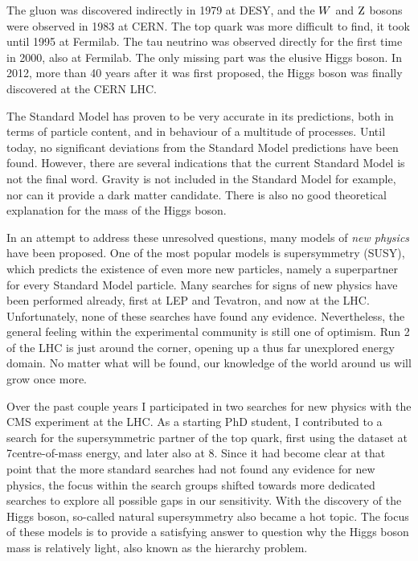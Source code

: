 The gluon was discovered indirectly in 1979 at DESY, and the $W$ and $\mathrm{Z}$ bosons were observed
in 1983 at CERN. The top quark was more difficult to find, it took until 1995 at Fermilab. The tau
neutrino was observed directly for the first time in 2000, also at Fermilab. The only missing part
was the elusive Higgs boson. In 2012, more than 40 years after it was first proposed, the Higgs
boson was finally discovered at the CERN LHC.

The Standard Model has proven to be very accurate in its predictions, both in terms of particle
content, and in behaviour of a multitude of processes. Until today, no significant deviations from
the Standard Model predictions have been found. However, there are several indications that the
current Standard Model is not the final word. Gravity is not included in the Standard Model for
example, nor can it provide a dark matter candidate. There is also no good theoretical explanation
for the mass of the Higgs boson. 

In an attempt to address these unresolved questions, many models of \textit{new physics} have been
proposed. One of the most popular models is supersymmetry (SUSY), which predicts the existence of
even more new particles, namely a superpartner for every Standard Model particle. 
Many searches for signs of new physics have been performed already, first at LEP and Tevatron, and
now at the LHC. Unfortunately, none of these searches have found any evidence.
Nevertheless, the general feeling within the experimental community is still one of optimism. Run 2
of the LHC is just around the corner, opening up a thus far unexplored energy domain. No matter what
will be found, our knowledge of the world around us will grow once more. 

Over the past couple years I participated in two searches for new physics with the CMS experiment at
the LHC. As a starting PhD student, I contributed to a search for the supersymmetric partner of the
top quark, first using the dataset at 7\TeV centre-of-mass energy, and later also at 8\TeV. 
Since it had become clear at that point that the more standard searches had not found any evidence
for new physics, the focus within the search groups shifted towards more dedicated searches to
explore all possible gaps in our sensitivity. With the discovery of the Higgs boson,
so-called natural supersymmetry also became a hot topic. 
The focus of these models is to provide a satisfying answer to question why the Higgs boson mass is
relatively light, also known as the hierarchy problem. 

